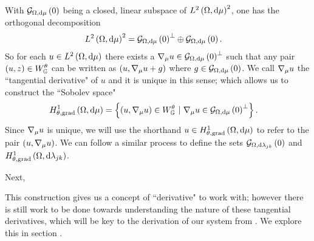 With $\mathcal{G}_{ \Omega, \mathrm{d}\mu}\left( 0 \right)$ being a closed, linear subspace of $L^{2}\left( \Omega,\mathrm{d}\mu \right)^2$, one has the orthogonal decomposition
\begin{align*}
	L^{2}\left( \Omega,\mathrm{d}\mu \right)^2 &= \mathcal{G}_{ \Omega, \mathrm{d}\mu}\left( 0 \right)^{\perp} \oplus \mathcal{G}_{ \Omega, \mathrm{d}\mu}\left( 0 \right).
\end{align*}
So for each $u\in L^{2}\left( \Omega,\mathrm{d}\mu \right)$ there exists a $\nabla_\mu u\in\mathcal{G}_{ \Omega, \mathrm{d}\mu}\left( 0 \right)^{\perp}$ such that any pair $\left( u,z \right)\in W^{\theta}_{\mathbb{G}}$ can be written as $\left( u,\nabla_\mu u + g \right)$ where $g\in\mathcal{G}_{ \Omega, \mathrm{d}\mu}\left( 0 \right)$.
We call $\nabla_\mu u$ the ``tangential derivative" of $u$ and it is unique in this sense; which allows us to construct the ``Sobolev space"
\begin{align*}
	H^1_{\theta, \mathrm{grad}}\left( \Omega, \mathrm{d}\mu \right) &= \left\{  \left( u, \nabla_\mu u \right)\in W^{\theta}_{\mathbb{G}} \ \vert \ \nabla_\mu u \in \mathcal{G}_{ \Omega, \mathrm{d}\mu}\left( 0 \right)^{\perp}  \right\}.
\end{align*}
Since $\nabla_\mu u$ is unique, we will use the shorthand $u\in H^1_{\theta, \mathrm{grad}}\left( \Omega, \mathrm{d}\mu \right)$ to refer to the pair $\left( u, \nabla_\mu u \right)$. 
We can follow a similar process to define the sets $\mathcal{G}_{ \Omega, \mathrm{d}\lambda_{jk}}\left( 0 \right)$ and $H^1_{\theta, \mathrm{grad}}\left( \Omega, \mathrm{d}\lambda_{jk} \right)$. \newline

Next, 

This construction gives us a concept of ``derivative" to work with; however there is still work to be done towards understanding the nature of these tangential derivatives, which will be key to the derivation of our system  from .
We explore this in section .
